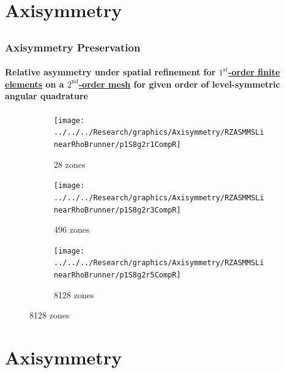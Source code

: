 \documentclass[compress,t]{beamer}
\begin{document}
\section{Axisymmetry}
\subsection{}

\begin{frame}
\frametitle{Axisymmetry Preservation}
\framesubtitle{Relative asymmetry under spatial refinement for \underline{$1^\text{st}$-order finite elements} on a \underline{$2^\text{nd}$-order mesh} for given order of level-symmetric angular quadrature}

\begin{figure}
\centering
\begin{subfigure}{0.33\textwidth}
\centering
\texttt{[image: ../../../Research/graphics/Axisymmetry/RZASMMSLinearRhoBrunner/p1S8g2r1CompR]}
\caption{28 zones}
\end{subfigure}%
\begin{subfigure}{0.33\textwidth}
\centering
\texttt{[image: ../../../Research/graphics/Axisymmetry/RZASMMSLinearRhoBrunner/p1S8g2r3CompR]}
\caption{496 zones}
\end{subfigure}%
\begin{subfigure}{0.33\textwidth}
\centering
\texttt{[image: ../../../Research/graphics/Axisymmetry/RZASMMSLinearRhoBrunner/p1S8g2r5CompR]}
\caption{8128 zones}
\end{subfigure}
\end{figure}

\end{frame}

\section{Axisymmetry}
\subsection{}
\end{document}
